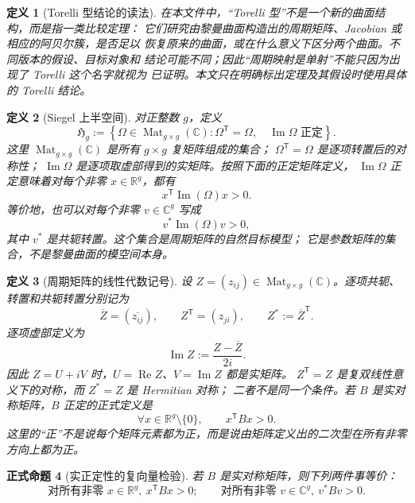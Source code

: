 \documentclass[UTF8,fontset=none,a4paper,11pt]{ctexart}
\theoremstyle{foundation-definition}
\newtheorem{definition}{定义}[section]
\theoremstyle{foundation-theorem}
\theoremstyle{foundation-proposition}
\newtheorem{proposition}[definition]{正式命题}
\theoremstyle{foundation-example}
\theoremstyle{foundation-remark}
\theoremstyle{foundation-theorem}
\begin{document}
\begin{definition}[Torelli 型结论的读法]\label{def:torelli-principle}
在本文件中，“Torelli 型”不是一个新的曲面结构，而是指一类比较定理：
它们研究由黎曼曲面构造出的周期矩阵、Jacobian 或相应的阿贝尔簇，是否足以
恢复原来的曲面，或在什么意义下区分两个曲面。不同版本的假设、目标对象和
结论可能不同；因此“周期映射是单射”不能只因为出现了 Torelli 这个名字就视为
已证明。本文只在明确标出定理及其假设时使用具体的 Torelli 结论。
\end{definition}

\begin{definition}[Siegel 上半空间]\label{def:siegel-upper-half-space}
对正整数 \(g\)，定义
\[
\mathfrak H_g
:=\left\{\Omega\in\operatorname{Mat}_{g\times g}(\mathbb C):
\Omega^{\mathsf T}=\Omega,\quad
\operatorname{Im}\Omega\text{ 正定}\right\}.
\]
这里 \(\operatorname{Mat}_{g\times g}(\mathbb C)\) 是所有 \(g\times g\) 复矩阵组成的集合；
\(\Omega^{\mathsf T}=\Omega\) 是逐项转置后的对称性；
\(\operatorname{Im}\Omega\) 是逐项取虚部得到的实矩阵。按照下面的正定矩阵定义，
\(\operatorname{Im}\Omega\) 正定意味着对每个非零 \(x\in\mathbb R^g\)，都有
\[
x^{\mathsf T}\operatorname{Im}(\Omega)x>0.
\]
等价地，也可以对每个非零 \(v\in\mathbb C^g\) 写成
\[
v^*\operatorname{Im}(\Omega)v>0,
\]
其中 \(v^*\) 是共轭转置。这个集合是周期矩阵的自然目标模型；
它是参数矩阵的集合，不是黎曼曲面的模空间本身。
\end{definition}

\begin{definition}[周期矩阵的线性代数记号]\label{def:complex-matrix-components}
设 \(Z=(z_{ij})\in\operatorname{Mat}_{g\times g}(\mathbb C)\)。逐项共轭、转置和共轭转置分别记为
\[
\overline Z=(\overline{z_{ij}}),\qquad
Z^{\mathsf T}=(z_{ji}),\qquad
Z^*:=\overline Z^{\mathsf T}.
\]
逐项虚部定义为
\[
\operatorname{Im}Z:=\frac{Z-\overline Z}{2i}.
\]
因此 \(Z=U+iV\) 时，\(U=\operatorname{Re}Z\)、\(V=\operatorname{Im}Z\) 都是实矩阵。
\(Z^{\mathsf T}=Z\) 是复双线性意义下的对称，而 \(Z^*=Z\) 是 Hermitian 对称；
二者不是同一个条件。若 \(B\) 是实对称矩阵，\(B\) 正定的正式定义是
\[
\forall x\in\mathbb R^g\setminus\{0\},\qquad
x^{\mathsf T}Bx>0.
\]
这里的“正”不是说每个矩阵元素都为正，而是说由矩阵定义出的二次型在所有非零方向上都为正。
\end{definition}

\begin{proposition}[实正定性的复向量检验]\label{prop:positive-definite-complex-test}
若 \(B\) 是实对称矩阵，则下列两件事等价：
\[
\text{对所有非零 }x\in\mathbb R^g,\ x^{\mathsf T}Bx>0;
\qquad
\text{对所有非零 }v\in\mathbb C^g,\ v^*Bv>0.
\]
\end{proposition}
\end{document}

